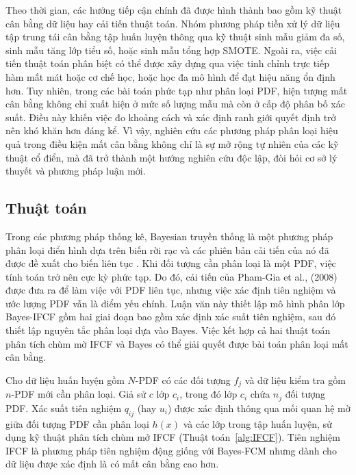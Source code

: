 \documentclass[a4paper,oneside]{book} %
\theoremstyle{plain}
\theoremstyle{plain}
\theoremstyle{nonumberplain}
\begin{document}
Theo thời gian, các hướng tiếp cận chính đã được hình thành bao gồm kỹ thuật cân bằng dữ liệu hay cải tiến thuật toán. Nhóm phương pháp tiền xử lý dữ liệu tập trung tái cân bằng tập huấn luyện thông qua kỹ thuật sinh mẫu giảm đa số, sinh mẫu tăng lớp tiểu số, hoặc sinh mẫu tổng hợp SMOTE. Ngoài ra, việc cải tiến thuật toán phân biệt có thể được xây dựng qua việc tinh chỉnh trực tiếp hàm mất mát hoặc cơ chế học, hoặc học đa mô hình để đạt hiệu năng ổn định hơn. 
Tuy nhiên, trong các bài toán phức tạp như phân loại PDF, hiện tượng mất cân bằng không chỉ xuất hiện ở mức số lượng mẫu mà còn ở cấp độ phân bố xác suất. Điều này khiến việc đo khoảng cách và xác định ranh giới quyết định trở nên khó khăn hơn đáng kể. Vì vậy, nghiên cứu các phương pháp phân loại hiệu quả trong điều kiện mất cân bằng không chỉ là sự mở rộng tự nhiên của các kỹ thuật cổ điển, mà đã trở thành một hướng nghiên cứu độc lập, đòi hỏi cơ sở lý thuyết và phương pháp luận mới.

\subsection{Thuật toán}


Trong các phương pháp thống kê, Bayesian truyền thống là một phương pháp phân loại điển hình dựa trên biến rời rạc và các phiên bản cải tiến của nó đã được đề xuất cho biến liên tục \cite{vo2025developing,vo2024supervised}. Khi đối tượng cần phân loại là một PDF, việc tính toán trở nên cực kỳ phức tạp. Do đó, cải tiến của Pham-Gia et al., (2008) được đưa ra để làm việc với PDF liên tục, nhưng việc xác định tiên nghiệm và ước lượng PDF vẫn là điểm yếu chính. Luận văn này thiết lập mô hình phân lớp Bayes-IFCF gồm hai giai đoạn bao gồm xác định xác suất tiên nghiệm, sau đó thiết lập nguyên tắc phân loại dựa vào Bayes. Việc kết hợp cả hai thuật toán phân tích chùm mờ IFCF và Bayes có thể giải quyết được bài toán phân loại mất cân bằng.



Cho dữ liệu huấn luyện gồm $N$-PDF có các đối tượng $f_j$ và dữ liệu kiểm tra gồm $n$-PDF mới cần phân loại.  Giả sử $c$ lớp $c_i$, trong đó lớp $c_i$ chứa $n_j$ đối tượng PDF. Xác suất tiên nghiệm $q_{ij}$ (hay $u_i$) được xác định thông qua mối quan hệ mờ giữa đối tượng PDF cần phân loại $h(x)$ và các lớp trong tập huấn luyện, sử dụng kỹ thuật phân tích chùm mở IFCF (Thuật toán~\ref{alg:IFCF}). Tiên nghiệm IFCF là phương pháp tiên nghiệm động giống với Bayes-FCM \cite{vovan2023multi,vovan2025classifying} nhưng dành cho dữ liệu được xác định là có mất cân bằng cao hơn. 
\end{document}

